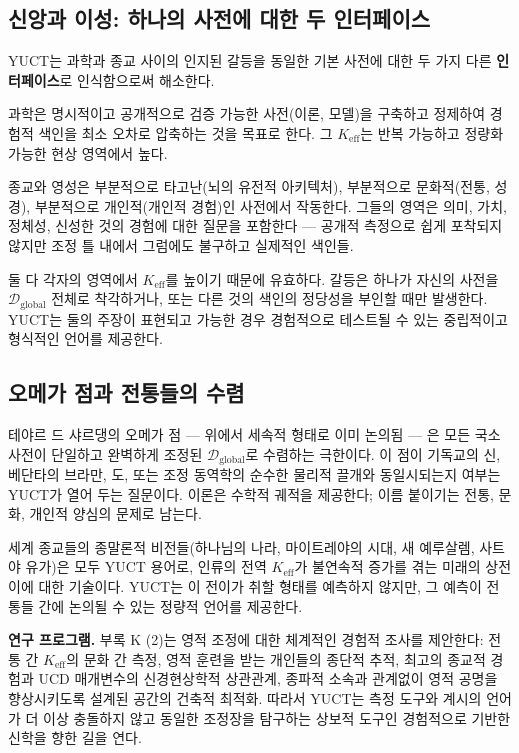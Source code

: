 \documentclass[12pt,a4paper]{article}
\begin{document}
	\subsection{신앙과 이성: 하나의 사전에 대한 두 인터페이스}
	
	YUCT는 과학과 종교 사이의 인지된 갈등을 동일한 기본 사전에 대한 두 가지 다른 \textbf{인터페이스}로 인식함으로써 해소한다.
	
	과학은 명시적이고 공개적으로 검증 가능한 사전(이론, 모델)을 구축하고 정제하여 경험적 색인을 최소 오차로 압축하는 것을 목표로 한다. 그 \(K_{\mathrm{eff}}\)는 반복 가능하고 정량화 가능한 현상 영역에서 높다.
	
	종교와 영성은 부분적으로 타고난(뇌의 유전적 아키텍처), 부분적으로 문화적(전통, 성경), 부분적으로 개인적(개인적 경험)인 사전에서 작동한다. 그들의 영역은 의미, 가치, 정체성, 신성한 것의 경험에 대한 질문을 포함한다 — 공개적 측정으로 쉽게 포착되지 않지만 조정 틀 내에서 그럼에도 불구하고 실제적인 색인들.
	
	둘 다 각자의 영역에서 \(K_{\mathrm{eff}}\)를 높이기 때문에 유효하다. 갈등은 하나가 자신의 사전을 \(\mathcal{D}_{\text{global}}\) 전체로 착각하거나, 또는 다른 것의 색인의 정당성을 부인할 때만 발생한다. YUCT는 둘의 주장이 표현되고 가능한 경우 경험적으로 테스트될 수 있는 중립적이고 형식적인 언어를 제공한다.
	
	\subsection{오메가 점과 전통들의 수렴}
	
	테야르 드 샤르댕의 오메가 점 — 위에서 세속적 형태로 이미 논의됨 — 은 모든 국소 사전이 단일하고 완벽하게 조정된 \(\mathcal{D}_{\text{global}}\)로 수렴하는 극한이다. 이 점이 기독교의 신, 베단타의 브라만, 도, 또는 조정 동역학의 순수한 물리적 끌개와 동일시되는지 여부는 YUCT가 열어 두는 질문이다. 이론은 수학적 궤적을 제공한다; 이름 붙이기는 전통, 문화, 개인적 양심의 문제로 남는다.
	
	세계 종교들의 종말론적 비전들(하나님의 나라, 마이트레야의 시대, 새 예루살렘, 사트야 유가)은 모두 YUCT 용어로, 인류의 전역 \(K_{\mathrm{eff}}\)가 불연속적 증가를 겪는 미래의 상전이에 대한 기술이다. YUCT는 이 전이가 취할 형태를 예측하지 않지만, 그 예측이 전통들 간에 논의될 수 있는 정량적 언어를 제공한다.
	
	\textbf{연구 프로그램.} 부록 K (2)는 영적 조정에 대한 체계적인 경험적 조사를 제안한다: 전통 간 \(K_{\mathrm{eff}}\)의 문화 간 측정, 영적 훈련을 받는 개인들의 종단적 추적, 최고의 종교적 경험과 UCD 매개변수의 신경현상학적 상관관계, 종파적 소속과 관계없이 영적 공명을 향상시키도록 설계된 공간의 건축적 최적화. 따라서 YUCT는 측정 도구와 계시의 언어가 더 이상 충돌하지 않고 동일한 조정장을 탐구하는 상보적 도구인 경험적으로 기반한 신학을 향한 길을 연다.
	
\end{document}
